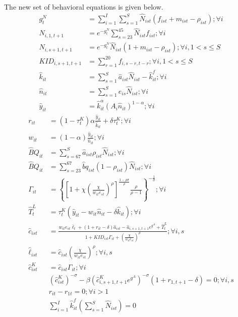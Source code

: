 \documentclass[letterpaper,12pt]{article}
\theoremstyle{definition}
\numberwithin{equation}{section}
\begin{document}
\begin{spacing}{1.5}
	The new set of behavioral equations is given below.
	\begin{align}
		g^N_t & = \sum_{i=1}^I \sum_{s=1}^S \hat N_{ist} (f_{ist}+m_{ist}-\rho_{ist}) ; \forall i\\
		\hat N_{i,1,t+1} & = e^{-g^N_t}\sum_{s=23}^{45} \hat N_{ist} f_{ist} ; \forall i\\
		\hat N_{i,s+1,t+1} & = e^{-g^N_t}\hat N_{ist} (1+m_{ist}-\rho_{ist}); \forall i, 1<s\le S \\
		KID_{i,s+1,t+1} & = \sum_{r=1}^{20} f_{i,s-r,t-r}; \forall i, 1<s\le S \\
		\hat k_{it} & = \sum_{s=1}^S \hat a_{ist} \hat N_{ist} - \hat k_{it}^f; \forall i \\
		\hat n_{it} & = \sum_{s=1}^S e_{is} \hat N_{ist}; \forall i \\
		\hat y_{it} & = \hat k_{it}^\alpha \left( A_{i} \hat n_{it} \right)^{1-\alpha} ; \forall i 
	\end{align}
	\begin{align}
		r_{it} & = (1-\tau^K_t)\alpha \frac{\hat y_{it}}{\hat k_{it}} + \delta \tau^K_t; \forall i \\
		w_{it} & = (1-\alpha) \frac{\hat y_{it}}{\hat n_{it}}; \forall i \\
		\hat BQ_{it} & = \sum_{s=67}^S \hat a_{ist} \rho_{ist} \hat N_{ist} ; \forall i \\
		\hat BQ_{it} & = \sum_{s=23}^{67} \hat bq_{ist} (1-\rho_{ist}) \hat N_{ist}	; \forall i \\
		\Gamma_{it} & = \left\{ \left[1 + \chi \left(\frac{\chi}{w_{it} e_{st}}\right)^\rho\right]^{\tfrac{1-\rho \sigma}{\rho}} \frac{\rho}{\rho-1} \right\}^{-\tfrac{1}{\sigma}}; \forall i \\
		\hat T^L_t & = \tau^K_t (\hat y_{it} - w_{it}\hat n_{it} - \delta \hat k_{it}); \forall i \\
    	\hat c_{ist} & = \frac{w_{it} e_{st} \bar \ell_t + (1+r_{it}-\delta)\hat a_{ist} - \hat a_{i,s+1,t+1} e^{g^A} + \hat T^L_t} {1 + KID_{ist}\Gamma_{it} + \left(\tfrac{\chi}{w_{it}e_{st}}\right)^\rho}; \forall i,s \\
		\hat \ell_{ist} & = \hat c_{ist} \left(\frac{\chi}{w_{it}e_{st}}\right)^\rho ; \forall i,s \\
		\hat c^K_{ist} & = \hat c_{ist} \Gamma_{it}; \forall i \\
		& \left({\hat c^K_{ist}}\right)^{-\sigma} - \beta \left(\hat c^K_{i,s+1,t+1} e^{g^A}\right)^{-\sigma}(1+r_{1,t+1}-\delta) = 0; \forall i,s \\
		& r_{it} - r_{1t} = 0; \forall i>1 \\
		& \sum_{i=1}^I \hat k^f_{it} \left( \sum_{s=1}^S \hat N_{ist} \right) = 0
	\end{align}

\end{spacing}
\end{document}
